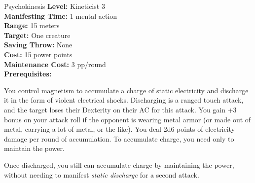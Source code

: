 {Psychokinesis}
{
	\textbf{Level:}
	Kineticist 3\\
	\textbf{Manifesting Time:}
	1 mental action\\
	\textbf{Range:}
	15 meters\\
	\textbf{Target:}
	One creature\\
	\textbf{Saving Throw:}
	None\\
	\textbf{Cost:}
	15 power points\\
	\textbf{Maintenance Cost:}
	3 pp/round\\
	\textbf{Prerequisites:}
	\\
}
{
	You control magnetism to accumulate a charge of static electricity and discharge it in the form of violent electrical shocks. Discharging is a ranged touch attack, and the target loses their Dexterity on their AC for this attack. You gain +3 bonus on your attack roll if the opponent is wearing metal armor (or made out of metal, carrying a lot of metal, or the like). You deal 2d6 points of electricity damage per round of accumulation. To accumulate charge, you need only to maintain the power.

	Once discharged, you still can accumulate charge by maintaining the power, without needing to manifest \emph{static discharge} for a second attack.
}